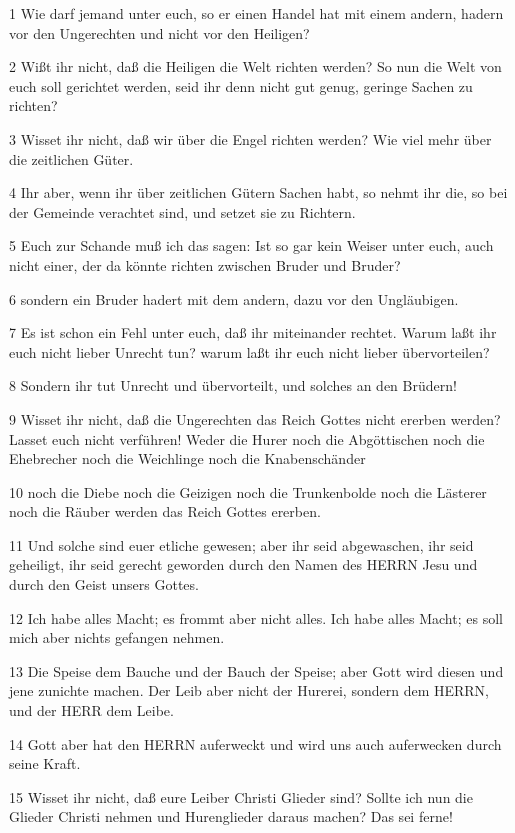 \par 1 Wie darf jemand unter euch, so er einen Handel hat mit einem andern, hadern vor den Ungerechten und nicht vor den Heiligen?
\par 2 Wißt ihr nicht, daß die Heiligen die Welt richten werden? So nun die Welt von euch soll gerichtet werden, seid ihr denn nicht gut genug, geringe Sachen zu richten?
\par 3 Wisset ihr nicht, daß wir über die Engel richten werden? Wie viel mehr über die zeitlichen Güter.
\par 4 Ihr aber, wenn ihr über zeitlichen Gütern Sachen habt, so nehmt ihr die, so bei der Gemeinde verachtet sind, und setzet sie zu Richtern.
\par 5 Euch zur Schande muß ich das sagen: Ist so gar kein Weiser unter euch, auch nicht einer, der da könnte richten zwischen Bruder und Bruder?
\par 6 sondern ein Bruder hadert mit dem andern, dazu vor den Ungläubigen.
\par 7 Es ist schon ein Fehl unter euch, daß ihr miteinander rechtet. Warum laßt ihr euch nicht lieber Unrecht tun? warum laßt ihr euch nicht lieber übervorteilen?
\par 8 Sondern ihr tut Unrecht und übervorteilt, und solches an den Brüdern!
\par 9 Wisset ihr nicht, daß die Ungerechten das Reich Gottes nicht ererben werden? Lasset euch nicht verführen! Weder die Hurer noch die Abgöttischen noch die Ehebrecher noch die Weichlinge noch die Knabenschänder
\par 10 noch die Diebe noch die Geizigen noch die Trunkenbolde noch die Lästerer noch die Räuber werden das Reich Gottes ererben.
\par 11 Und solche sind euer etliche gewesen; aber ihr seid abgewaschen, ihr seid geheiligt, ihr seid gerecht geworden durch den Namen des HERRN Jesu und durch den Geist unsers Gottes.
\par 12 Ich habe alles Macht; es frommt aber nicht alles. Ich habe alles Macht; es soll mich aber nichts gefangen nehmen.
\par 13 Die Speise dem Bauche und der Bauch der Speise; aber Gott wird diesen und jene zunichte machen. Der Leib aber nicht der Hurerei, sondern dem HERRN, und der HERR dem Leibe.
\par 14 Gott aber hat den HERRN auferweckt und wird uns auch auferwecken durch seine Kraft.
\par 15 Wisset ihr nicht, daß eure Leiber Christi Glieder sind? Sollte ich nun die Glieder Christi nehmen und Hurenglieder daraus machen? Das sei ferne!
